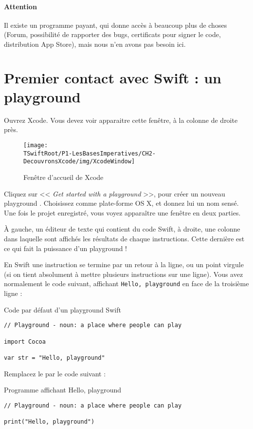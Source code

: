 \paragraph{Attention}
Il existe un programme payant, qui donne accès à beaucoup plus de choses (Forum, possibilité de rapporter des bugs, certificats pour signer le code, distribution App Store), mais nous n'en avons pas besoin ici.


\section{Premier contact avec Swift : un playground}
Ouvrez Xcode.
Vous devez voir apparaitre cette fenêtre, à la colonne de droite près.
\begin{figure}[H]
\centering
\texttt{[image: \\TSwiftRoot/P1-LesBasesImperatives/CH2-DecouvronsXcode/img/XcodeWindow]}
\caption{Fenêtre d'accueil de Xcode}
\end{figure}

Cliquez sur << \emph{Get started with a playground} >>,
pour créer un nouveau \og playground \fg{}.
Choisissez comme plate-forme OS X, et donnez lui un nom sensé.
Une fois le projet enregistré, vous voyez apparaître une fenêtre en deux parties.

À gauche, un éditeur de texte qui contient du code Swift,
à droite, une colonne dans laquelle sont affichés
les résultats de chaque instructions.
Cette dernière est ce qui fait la puissance d'un \og playground \fg{} !

En Swift une instruction se termine par un retour à la ligne, ou un point virgule
(si on tient absolument à mettre plusieurs instructions sur une ligne).
Vous avez normalement le code suivant,
affichant \verb"Hello, playground" en face de la troisième ligne :
\begin{listing}[H]
\caption{Code par défaut d'un \og playground \fg{} Swift}
\begin{verbatim}
// Playground - noun: a place where people can play

import Cocoa

var str = "Hello, playground"
\end{verbatim}
\end{listing}

Remplacez le par le code suivant :
\begin{listing}[H]
\caption{Programme affichant \og Hello, playground \fg{}}
\begin{verbatim}
// Playground - noun: a place where people can play

print("Hello, playground")
\end{verbatim}
\end{listing}

